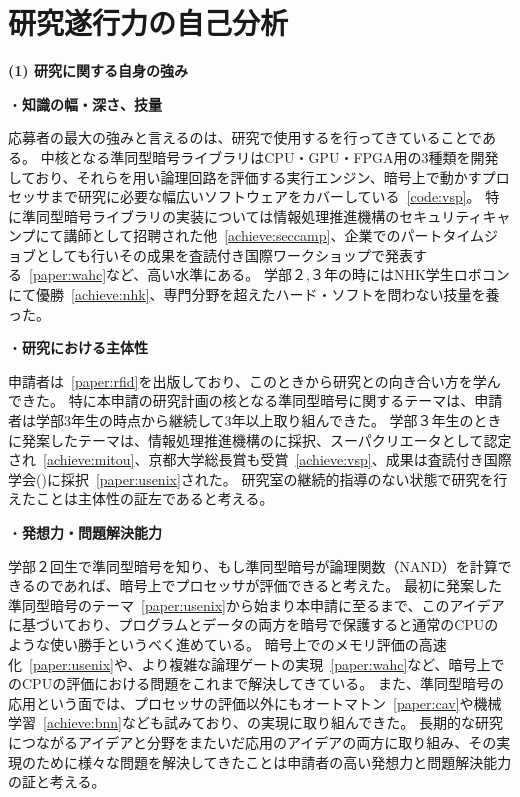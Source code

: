
\section{研究遂行力の自己分析}

\noindent\textbf{(1) 研究に関する自身の強み}

\noindent・\textbf{知識の幅・深さ、技量}

応募者の最大の強みと言えるのは、研究で使用するを行ってきていることである。
中核となる準同型暗号ライブラリはCPU・GPU・FPGA用の3種類を開発しており、それらを用い論理回路を評価する実行エンジン、暗号上で動かすプロセッサまで研究に必要な幅広いソフトウェアをカバーしている~\cref{code:vsp}。
特に準同型暗号ライブラリの実装については情報処理推進機構のセキュリティキャンプにて講師として招聘された他~\cref{achieve:seccamp}、企業でのパートタイムジョブとしても行いその成果を査読付き国際ワークショップで発表する~\cref{paper:wahc}など、高い水準にある。
学部２,３年の時にはNHK学生ロボコンにて優勝~\cref{achieve:nhk}、専門分野を超えたハード・ソフトを問わない技量を養った。

\noindent・\textbf{研究における主体性}

申請者は~\cref{paper:rfid}を出版しており、このときから研究との向き合い方を学んできた。
特に本申請の研究計画の核となる準同型暗号に関するテーマは、申請者は学部3年生の時点から継続して3年以上取り組んできた。
学部３年生のときに発案したテーマは、情報処理推進機構のに採択、スーパクリエータとして認定され~\cref{achieve:mitou}、京都大学総長賞も受賞~\cref{achieve:vsp}、成果は査読付き国際学会()に採択~\cref{paper:usenix}された。
研究室の継続的指導のない状態で研究を行えたことは主体性の証左であると考える。

\noindent・\textbf{発想力・問題解決能力}

学部２回生で準同型暗号を知り、もし準同型暗号が論理関数（NAND）を計算できるのであれば、暗号上でプロセッサが評価できると考えた。
最初に発案した準同型暗号のテーマ~\cref{paper:usenix}から始まり本申請に至るまで、このアイデアに基づいており、プログラムとデータの両方を暗号で保護すると通常のCPUのような使い勝手というべく進めている。
暗号上でのメモリ評価の高速化~\cref{paper:usenix}や、より複雑な論理ゲートの実現~\cref{paper:wahc}など、暗号上でのCPUの評価における問題をこれまで解決してきている。
また、準同型暗号の応用という面では、プロセッサの評価以外にもオートマトン~\cref{paper:cav}や機械学習~\cref{achieve:bnn}なども試みており、の実現に取り組んできた。
長期的な研究につながるアイデアと分野をまたいだ応用のアイデアの両方に取り組み、その実現のために様々な問題を解決してきたことは申請者の高い発想力と問題解決能力の証と考える。


